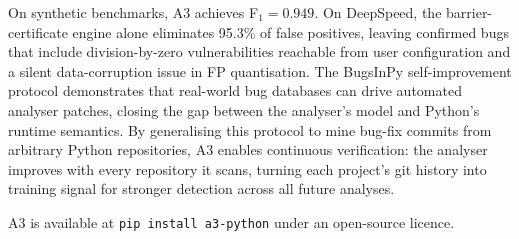\documentclass[sigconf,review,anonymous]{acmart}
\begin{document}
On synthetic benchmarks, \textsc{A3} achieves F$_1 = 0.949$.
On DeepSpeed, the barrier-certificate engine alone eliminates 95.3\% of false positives, leaving confirmed bugs that include division-by-zero vulnerabilities reachable from user configuration and a silent data-corruption issue in FP quantisation.
The BugsInPy self-improvement protocol demonstrates that real-world bug databases can drive automated analyser patches, closing the gap between the analyser's model and Python's runtime semantics.
By generalising this protocol to mine bug-fix commits from arbitrary Python repositories, \textsc{A3} enables continuous verification: the analyser improves with every repository it scans, turning each project's git history into training signal for stronger detection across all future analyses.

\textsc{A3} is available at \texttt{pip install a3-python} under an open-source licence.



\end{document}
